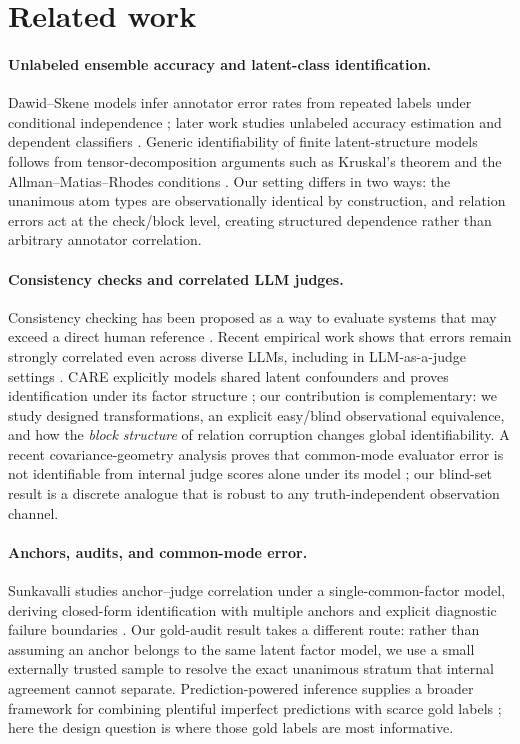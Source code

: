 \documentclass[11pt]{article}
\theoremstyle{definition}
\theoremstyle{remark}
\begin{document}
\section{Related work}
\label{sec:related}

\paragraph{Unlabeled ensemble accuracy and latent-class identification.}
Dawid--Skene models infer annotator error rates from repeated labels under conditional independence \cite{dawid1979}; later work studies unlabeled accuracy estimation and dependent classifiers \cite{platanios2014,jaffe2016}. Generic identifiability of finite latent-structure models follows from tensor-decomposition arguments such as Kruskal's theorem and the Allman--Matias--Rhodes conditions \cite{kruskal1977,allman2009}. Our setting differs in two ways: the unanimous atom types are observationally identical by construction, and relation errors act at the check/block level, creating structured dependence rather than arbitrary annotator correlation.

\paragraph{Consistency checks and correlated LLM judges.}
Consistency checking has been proposed as a way to evaluate systems that may exceed a direct human reference \cite{fluri2023}. Recent empirical work shows that errors remain strongly correlated even across diverse LLMs, including in LLM-as-a-judge settings \cite{kim2025,kohli2026}. CARE explicitly models shared latent confounders and proves identification under its factor structure \cite{zhao2026}; our contribution is complementary: we study designed transformations, an explicit easy/blind observational equivalence, and how the \emph{block structure} of relation corruption changes global identifiability. A recent covariance-geometry analysis proves that common-mode evaluator error is not identifiable from internal judge scores alone under its model \cite{afrin2026}; our blind-set result is a discrete analogue that is robust to any truth-independent observation channel.

\paragraph{Anchors, audits, and common-mode error.}
Sunkavalli studies anchor--judge correlation under a single-common-factor model, deriving closed-form identification with multiple anchors and explicit diagnostic failure boundaries \cite{sunkavalli2026}. Our gold-audit result takes a different route: rather than assuming an anchor belongs to the same latent factor model, we use a small externally trusted sample to resolve the exact unanimous stratum that internal agreement cannot separate. Prediction-powered inference supplies a broader framework for combining plentiful imperfect predictions with scarce gold labels \cite{angelopoulos2023}; here the design question is where those gold labels are most informative.
\end{document}
